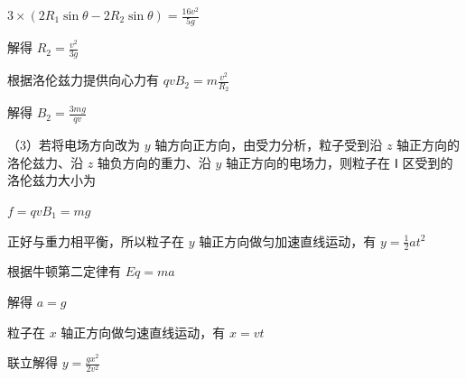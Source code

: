 \documentclass[\gkver]{gaokaozhenti}
\begin{document}
\begin{enumerate}
{$3 \times (2R_{1}\sin\theta - 2R_{2}\sin\theta) = \frac{16v^{2}}{5g}$

解得 $R_{2} = \frac{v^{2}}{3g}$

根据洛伦兹力提供向心力有 $qvB_{2} = m\frac{v^{2}}{R_{2}}$

解得 $B_{2} = \frac{3mg}{qv}$

（3）若将电场方向改为 $y$ 轴方向正方向，由受力分析，粒子受到沿 $z$ 轴正方向的洛伦兹力、沿 $z$ 轴负方向的重力、沿 $y$ 轴正方向的电场力，则粒子在 Ⅰ 区受到的洛伦兹力大小为

$f = qvB_{1} = mg$

正好与重力相平衡，所以粒子在 $y$ 轴正方向做匀加速直线运动，有 $y = \frac{1}{2}at^{2}$

根据牛顿第二定律有 $Eq = ma$

解得 $a = g$

粒子在 $x$ 轴正方向做匀速直线运动，有 $x = vt$

联立解得 $y = \frac{gx^{2}}{2v^{2}}$
}

\end{enumerate}
\end{document}
